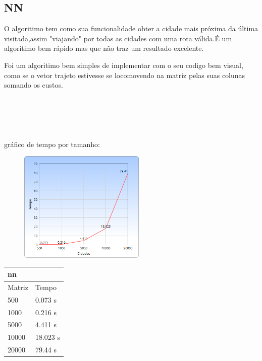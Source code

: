 \documentclass[a4paper,10pt]{article}
\begin{document}
 \subsection{NN}
	O algoritimo tem como sua funcionalidade obter a cidade mais próxima da última visitada,assim "viajando" por todas as cidades com uma rota válida.É um algoritimo bem rápido mas que não traz um resultado excelente. 
 
 Foi um algoritimo bem simples de implementar com o seu codigo bem visual, como se o vetor trajeto estivesse se locomovendo na matriz pelas suas colunas somando os custos.   
\\\\\\\\\\\\gráfico de tempo por tamanho:
\begin{figure}[!htb]
  \includegraphics[width=6cm]{nn.png}
  \end{figure}
\begin{table}[ht]

\centering
\label{nn}
\begin{tabular}{|ll|}
\hline
nn	                         &          \\ \hline
\multicolumn{1}{|l|}{Matriz} & Tempo    \\ \hline
\multicolumn{1}{|l|}{500}    & 0.073 s  \\ \hline
\multicolumn{1}{|l|}{1000}   & 0.216 s  \\ \hline
\multicolumn{1}{|l|}{5000}   & 4.411 s  \\ \hline
\multicolumn{1}{|l|}{10000}  & 18.023 s \\ \hline
\multicolumn{1}{|l|}{20000}  & 79.44 s  \\ \hline
\end{tabular}
\end{table}
\end{document}
